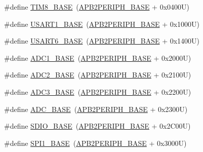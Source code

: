 \begin{DoxyCompactItemize}
\item 
\#define \hyperlink{group___peripheral__memory__map_ga5b72f698b7a048a6f9fcfe2efe5bc1db}{T\+I\+M8\+\_\+\+B\+A\+SE}~(\hyperlink{group___peripheral__memory__map_ga25b99d6065f1c8f751e78f43ade652cb}{A\+P\+B2\+P\+E\+R\+I\+P\+H\+\_\+\+B\+A\+SE} + 0x0400\+U)
\item 
\#define \hyperlink{group___peripheral__memory__map_ga86162ab3f740db9026c1320d46938b4d}{U\+S\+A\+R\+T1\+\_\+\+B\+A\+SE}~(\hyperlink{group___peripheral__memory__map_ga25b99d6065f1c8f751e78f43ade652cb}{A\+P\+B2\+P\+E\+R\+I\+P\+H\+\_\+\+B\+A\+SE} + 0x1000\+U)
\item 
\#define \hyperlink{group___peripheral__memory__map_gade4d3907fd0387ee832f426f52d568bb}{U\+S\+A\+R\+T6\+\_\+\+B\+A\+SE}~(\hyperlink{group___peripheral__memory__map_ga25b99d6065f1c8f751e78f43ade652cb}{A\+P\+B2\+P\+E\+R\+I\+P\+H\+\_\+\+B\+A\+SE} + 0x1400\+U)
\item 
\#define \hyperlink{group___peripheral__memory__map_ga695c9a2f892363a1c942405c8d351b91}{A\+D\+C1\+\_\+\+B\+A\+SE}~(\hyperlink{group___peripheral__memory__map_ga25b99d6065f1c8f751e78f43ade652cb}{A\+P\+B2\+P\+E\+R\+I\+P\+H\+\_\+\+B\+A\+SE} + 0x2000\+U)
\item 
\#define \hyperlink{group___peripheral__memory__map_ga6544abc57f9759f610eee09a02442ae6}{A\+D\+C2\+\_\+\+B\+A\+SE}~(\hyperlink{group___peripheral__memory__map_ga25b99d6065f1c8f751e78f43ade652cb}{A\+P\+B2\+P\+E\+R\+I\+P\+H\+\_\+\+B\+A\+SE} + 0x2100\+U)
\item 
\#define \hyperlink{group___peripheral__memory__map_gaca766f86c8e0b00a8e2b0224dcbb4c82}{A\+D\+C3\+\_\+\+B\+A\+SE}~(\hyperlink{group___peripheral__memory__map_ga25b99d6065f1c8f751e78f43ade652cb}{A\+P\+B2\+P\+E\+R\+I\+P\+H\+\_\+\+B\+A\+SE} + 0x2200\+U)
\item 
\#define \hyperlink{group___peripheral__memory__map_gad06cb9e5985bd216a376f26f22303cd6}{A\+D\+C\+\_\+\+B\+A\+SE}~(\hyperlink{group___peripheral__memory__map_ga25b99d6065f1c8f751e78f43ade652cb}{A\+P\+B2\+P\+E\+R\+I\+P\+H\+\_\+\+B\+A\+SE} + 0x2300\+U)
\item 
\#define \hyperlink{group___peripheral__memory__map_ga95dd0abbc6767893b4b02935fa846f52}{S\+D\+I\+O\+\_\+\+B\+A\+SE}~(\hyperlink{group___peripheral__memory__map_ga25b99d6065f1c8f751e78f43ade652cb}{A\+P\+B2\+P\+E\+R\+I\+P\+H\+\_\+\+B\+A\+SE} + 0x2\+C00\+U)
\item 
\#define \hyperlink{group___peripheral__memory__map_ga50cd8b47929f18b05efbd0f41253bf8d}{S\+P\+I1\+\_\+\+B\+A\+SE}~(\hyperlink{group___peripheral__memory__map_ga25b99d6065f1c8f751e78f43ade652cb}{A\+P\+B2\+P\+E\+R\+I\+P\+H\+\_\+\+B\+A\+SE} + 0x3000\+U)

\end{DoxyCompactItemize}
